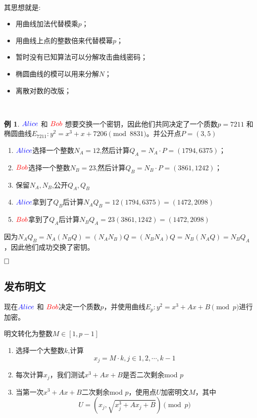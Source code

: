 \documentclass{article}
\theoremstyle{definition}
\newtheorem{example}{\indent 例}
\begin{document}
~\\

其思想就是:

\begin{itemize}
\item 用曲线加法代替模乘$p$；
\item 用曲线上点的整数倍来代替模幂$p$；
\item 暂时没有已知算法可以分解攻击曲线密码；
\item 椭圆曲线的模可以用来分解$N$；
\item 离散对数的改版；
\end{itemize}

~\\

\begin{example}
${\color{blue}Alice}$ 和 ${\color{red}Bob}$ 想要交换一个密钥，因此他们共同决定了一个质数$p = 7211$ 和椭圆曲线$ E_{7211} : y^2 = x^3 +x+7206 \pmod{8831}$。并公开点$P = (3,5)$

\begin{enumerate}
\item ${\color{blue}Alice}$选择一个整数$N_A = 12$,然后计算$Q_A = N_A \cdot P = (1794,6375)$；
\item ${\color{red}Bob}$选择一个整数$N_B = 23$,然后计算$Q_B = N_B \cdot P = (3861,1242)$；
\item 保留$N_A,N_B$,公开$Q_A,Q_B$
\item ${\color{blue}Alice}$拿到了$Q_B$后计算$N_AQ_B = 12(1794,6375)  = (1472,2098)$
\item ${\color{red}Bob}$拿到了$Q_A$后计算$N_BQ_A= 23(3861,1242)  = (1472,2098)$
\end{enumerate}

因为$N_AQ_B=N_A(N_BQ)=(N_AN_B)Q=(N_BN_A)Q=N_B(N_AQ)=N_BQ_A$，因此他们成功交换了密钥。

\end{example}
$\hfill\square$ 

\subsection{发布明文}

现在${\color{blue}Alice}$ 和 ${\color{red}Bob}$决定一个质数$p$，并使用曲线$E_p:y^2 = x^3+Ax+B \pmod{p}$进行加密。

明文转化为整数$M \in [1,p-1]$

\begin{enumerate}
\item 选择一个大整数$k$,计算
$$x_j = M \cdot k, j \in {1,2,\cdots,k-1}$$
\item 每次计算$x_j$，我们测试$x^3+Ax+B$是否二次剩余mod $p$
\item 当第一次$x^3+Ax+B$二次剩余mod $p$，使用点$U$加密明文$M$，其中
$$U = \left(x_j,\sqrt{x_j^3+Ax_j+B}\right) \pmod{p}$$
\end{enumerate}
\end{document}
